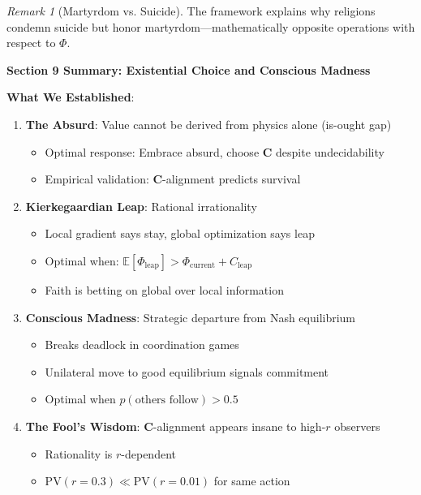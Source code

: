 \documentclass[11pt,a4paper]{article}
\theoremstyle{definition}
\theoremstyle{remark}
\newtheorem{remark}{Remark}[section]
\begin{document}
\begin{enumerate}
\begin{remark}[Martyrdom vs. Suicide]
The framework explains why religions condemn suicide but honor martyrdom—mathematically opposite operations with respect to \(\Phi\).
\end{remark}

\begin{mdframed}[backgroundcolor=green!10,linewidth=2pt,linecolor=green!70!black]
\textbf{Section 9 Summary: Existential Choice and Conscious Madness}

\textbf{What We Established}:
\begin{enumerate}[nosep]
    \item \textbf{The Absurd}: Value cannot be derived from physics alone (is-ought gap)
        \begin{itemize}[nosep]
            \item Optimal response: Embrace absurd, choose \(\mathbf{C}\) despite undecidability
            \item Empirical validation: \(\mathbf{C}\)-alignment predicts survival
        \end{itemize}
    \item \textbf{Kierkegaardian Leap}: Rational irrationality
        \begin{itemize}[nosep]
            \item Local gradient says stay, global optimization says leap
            \item Optimal when: \(\mathbb{E}[\Phi_{\text{leap}}] > \Phi_{\text{current}} + C_{\text{leap}}\)
            \item Faith is betting on global over local information
        \end{itemize}
    \item \textbf{Conscious Madness}: Strategic departure from Nash equilibrium
        \begin{itemize}[nosep]
            \item Breaks deadlock in coordination games
            \item Unilateral move to good equilibrium signals commitment
            \item Optimal when \(p(\text{others follow}) > 0.5\)
        \end{itemize}
    \item \textbf{The Fool's Wisdom}: \(\mathbf{C}\)-alignment appears insane to high-\(r\) observers
        \begin{itemize}[nosep]
            \item Rationality is \(r\)-dependent
            \item \(\text{PV}(r=0.3) \ll \text{PV}(r=0.01)\) for same action

\end{itemize}
\end{enumerate}
\end{mdframed}
\end{enumerate}
\end{document}
